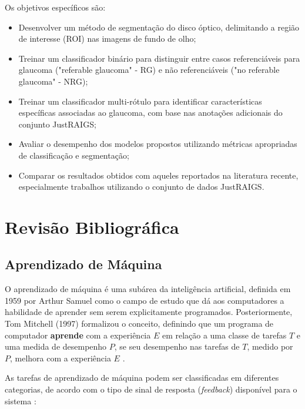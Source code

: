 \documentclass[12pt]{article}
\begin{document}
Os objetivos específicos são:
\begin{itemize}
    \item Desenvolver um método de segmentação do disco óptico, delimitando a região de interesse (ROI) nas imagens de fundo de olho;
    \item Treinar um classificador binário para distinguir entre casos referenciáveis para glaucoma ("referable glaucoma" - RG) e não referenciáveis ("no referable glaucoma" - NRG);
    \item Treinar um classificador multi-rótulo para identificar características específicas associadas ao glaucoma, com base nas anotações adicionais do conjunto JustRAIGS;
    \item Avaliar o desempenho dos modelos propostos utilizando métricas apropriadas de classificação e segmentação;
    \item Comparar os resultados obtidos com aqueles reportados na literatura recente, especialmente trabalhos utilizando o conjunto de dados JustRAIGS.
\end{itemize}

\bigskip

\section{Revisão Bibliográfica}
\label{sec:review}

\subsection{Aprendizado de Máquina}
\label{sec:review:machine_learning}

O aprendizado de máquina é uma subárea da inteligência artificial, definida em 1959 por Arthur Samuel como o campo de estudo que dá aos computadores a habilidade de aprender sem serem explicitamente programados. Posteriormente, Tom Mitchell (1997) formalizou o conceito, definindo que um programa de computador \textbf{aprende} com a experiência $E$ em relação a uma classe de tarefas $T$ e uma medida de desempenho $P$, se seu desempenho nas tarefas de $T$, medido por $P$, melhora com a experiência $E$ \cite{mitchell1997machine}.

As tarefas de aprendizado de máquina podem ser classificadas em diferentes categorias, de acordo com o tipo de sinal de resposta (\textit{feedback}) disponível para o sistema \cite{russell2010artificial}:
\end{document}

